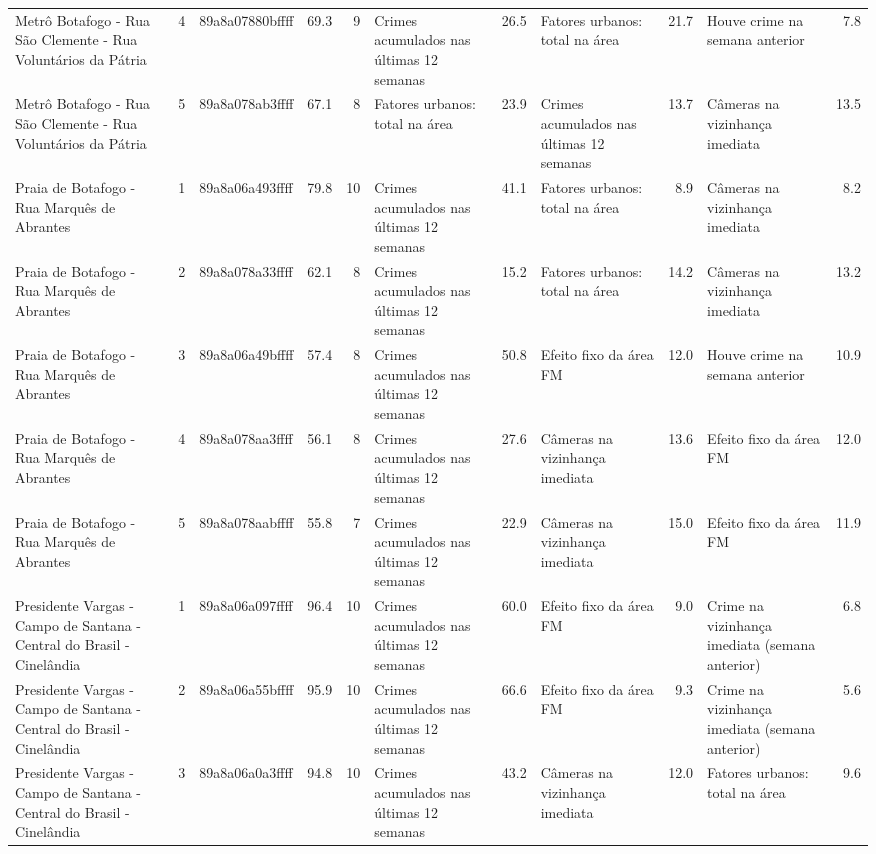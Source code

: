 \begin{tabular}{lrlrrlrlrlr}
Metrô Botafogo - Rua São Clemente - Rua Voluntários da Pátria & 4 & 89a8a07880bffff & 69.3 & 9 & Crimes acumulados nas últimas 12 semanas & 26.5 & Fatores urbanos: total na área & 21.7 & Houve crime na semana anterior & 7.8 \\
Metrô Botafogo - Rua São Clemente - Rua Voluntários da Pátria & 5 & 89a8a078ab3ffff & 67.1 & 8 & Fatores urbanos: total na área & 23.9 & Crimes acumulados nas últimas 12 semanas & 13.7 & Câmeras na vizinhança imediata & 13.5 \\
Praia de Botafogo - Rua Marquês de Abrantes & 1 & 89a8a06a493ffff & 79.8 & 10 & Crimes acumulados nas últimas 12 semanas & 41.1 & Fatores urbanos: total na área & 8.9 & Câmeras na vizinhança imediata & 8.2 \\
Praia de Botafogo - Rua Marquês de Abrantes & 2 & 89a8a078a33ffff & 62.1 & 8 & Crimes acumulados nas últimas 12 semanas & 15.2 & Fatores urbanos: total na área & 14.2 & Câmeras na vizinhança imediata & 13.2 \\
Praia de Botafogo - Rua Marquês de Abrantes & 3 & 89a8a06a49bffff & 57.4 & 8 & Crimes acumulados nas últimas 12 semanas & 50.8 & Efeito fixo da área FM & 12.0 & Houve crime na semana anterior & 10.9 \\
Praia de Botafogo - Rua Marquês de Abrantes & 4 & 89a8a078aa3ffff & 56.1 & 8 & Crimes acumulados nas últimas 12 semanas & 27.6 & Câmeras na vizinhança imediata & 13.6 & Efeito fixo da área FM & 12.0 \\
Praia de Botafogo - Rua Marquês de Abrantes & 5 & 89a8a078aabffff & 55.8 & 7 & Crimes acumulados nas últimas 12 semanas & 22.9 & Câmeras na vizinhança imediata & 15.0 & Efeito fixo da área FM & 11.9 \\
Presidente Vargas - Campo de Santana - Central do Brasil - Cinelândia & 1 & 89a8a06a097ffff & 96.4 & 10 & Crimes acumulados nas últimas 12 semanas & 60.0 & Efeito fixo da área FM & 9.0 & Crime na vizinhança imediata (semana anterior) & 6.8 \\
Presidente Vargas - Campo de Santana - Central do Brasil - Cinelândia & 2 & 89a8a06a55bffff & 95.9 & 10 & Crimes acumulados nas últimas 12 semanas & 66.6 & Efeito fixo da área FM & 9.3 & Crime na vizinhança imediata (semana anterior) & 5.6 \\
Presidente Vargas - Campo de Santana - Central do Brasil - Cinelândia & 3 & 89a8a06a0a3ffff & 94.8 & 10 & Crimes acumulados nas últimas 12 semanas & 43.2 & Câmeras na vizinhança imediata & 12.0 & Fatores urbanos: total na área & 9.6 \\

\end{tabular}
